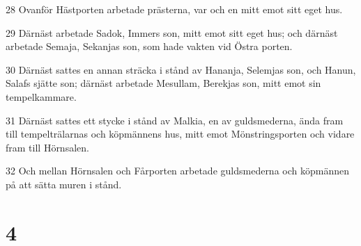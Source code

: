\par 28 Ovanför Hästporten arbetade prästerna, var och en mitt emot sitt eget hus.
\par 29 Därnäst arbetade Sadok, Immers son, mitt emot sitt eget hus; och därnäst arbetade Semaja, Sekanjas son, som hade vakten vid Östra porten.
\par 30 Därnäst sattes en annan sträcka i stånd av Hananja, Selemjas son, och Hanun, Salafs sjätte son; därnäst arbetade Mesullam, Berekjas son, mitt emot sin tempelkammare.
\par 31 Därnäst sattes ett stycke i stånd av Malkia, en av guldsmederna, ända fram till tempelträlarnas och köpmännens hus, mitt emot Mönstringsporten och vidare fram till Hörnsalen.
\par 32 Och mellan Hörnsalen och Fårporten arbetade guldsmederna och köpmännen på att sätta muren i stånd.

\chapter{4}


